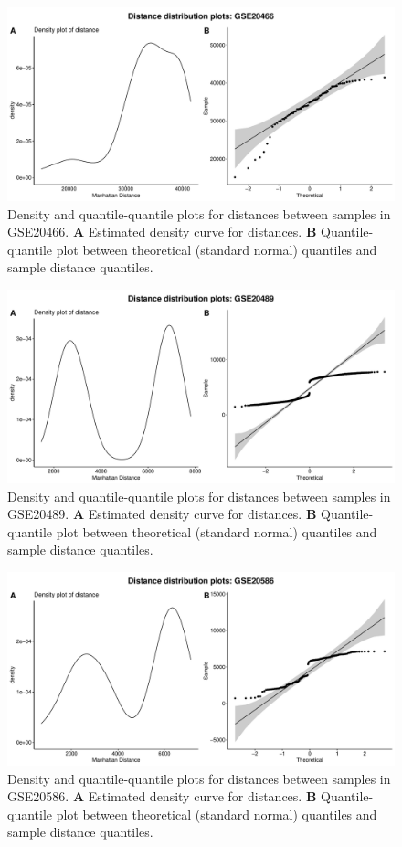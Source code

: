 \documentclass[10pt,letterpaper]{article}\usepackage[]{graphicx}\usepackage[]{color}
\begin{document}
\begin{figure}[H]
	\includegraphics[width=\textwidth]{manhattan-distance_hist_GSE20466.pdf}
	\caption{Density and quantile-quantile plots for distances between samples in GSE20466. \textbf{A} Estimated density curve for distances. \textbf{B} Quantile-quantile plot between theoretical (standard normal) quantiles and sample distance quantiles.}
\end{figure}

\begin{figure}[H]
	\includegraphics[width=\textwidth]{manhattan-distance_hist_GSE20489.pdf}
	\caption{Density and quantile-quantile plots for distances between samples in GSE20489. \textbf{A} Estimated density curve for distances. \textbf{B} Quantile-quantile plot between theoretical (standard normal) quantiles and sample distance quantiles.}
\end{figure}

\begin{figure}[H]
	\includegraphics[width=\textwidth]{manhattan-distance_hist_GSE20586.pdf}
	\caption{Density and quantile-quantile plots for distances between samples in GSE20586. \textbf{A} Estimated density curve for distances. \textbf{B} Quantile-quantile plot between theoretical (standard normal) quantiles and sample distance quantiles.}
\end{figure}
\end{document}
